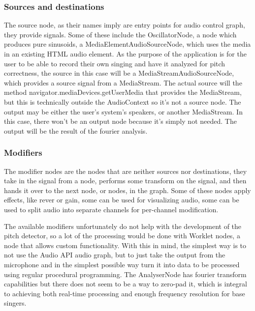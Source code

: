 \subsubsection{Sources and destinations}
The source node, as their names imply are entry points for audio control graph, they provide signals. Some of these include the OscillatorNode, a node which produces pure sinusoids, a MediaElementAudioSourceNode, which uses the media in an existing HTML audio element. As the purpose of the application is for the user to be able to record their own singing and have it analyzed for pitch correctness, the source in this case will be a MediaStreamAudioSourceNode, which provides a source signal from a MediaStream. The actual source will the method navigator.mediaDevices.getUserMedia\(\) that provides the MediaStream, but this is technically outside the AudioContext so it's not a source node.  
The output may be either the user's system's speakers, or another MediaStream. In this case, there won't be an output node because it's simply not needed. The output will be the result of the fourier analysis.

\subsubsection{Modifiers} 
The modifier nodes are the nodes that are neither sources nor destinations, they take in the signal from a node, performs some transform on the signal, and then hands it over to the next node, or nodes, in the graph. Some of these nodes apply effects, like rever or gain, some can be used for visualizing audio, some can be used to split audio into separate channels for per-channel modification.

The available modifiers unfortunately do not help with the development of the pitch detector, so a lot of the processing would be done with Worklet nodes, a node that allows custom functionality. With this in mind, the simplest way is to not use the Audio API audio graph, but to just take the output from the microphone and in the simplest possible way turn it into data to be processed using regular procedural programming. The AnalyserNode has fourier transform capabilities but there does not seem to be a way to zero-pad it, which is integral to achieving both real-time processing and enough frequency resolution for base singers. 

